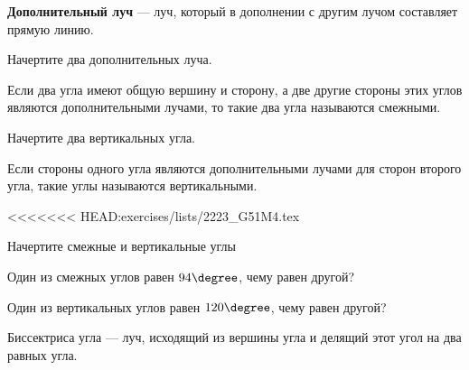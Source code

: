 \begin{class}[number=8]
	\begin{definit}
		\textbf{Дополнительный луч} --- луч, который в дополнении с другим лучом составляет прямую линию.
	\end{definit}
	\begin{listofex}[resume]
		\item Начертите два дополнительных луча.
	\end{listofex}
	\begin{definit}
		Если два угла имеют общую вершину и сторону, а две другие стороны этих углов являются дополнительными лучами, то такие два угла называются смежными.
	\end{definit}
	\begin{listofex}[resume]
		\item Начертите два вертикальных угла.
	\end{listofex}
	\begin{definit}
		Если стороны одного угла являются дополнительными лучами для сторон второго угла, такие углы называются вертикальными.
	\end{definit}
	\begin{listofex}
<<<<<<< HEAD:exercises/lists/2223_G51M4.tex
	 \item Начертите смежные и вертикальные углы
	 \item Один из смежных углов равен \( 94\degree \), чему равен другой?
	 \item Один из вертикальных углов равен \( 120\degree \), чему равен другой?
 	\begin{center}
 		Биссектриса угла --- луч, исходящий из вершины угла и делящий этот угол на два равных угла.

\end{center}
\end{listofex}
\end{class}
